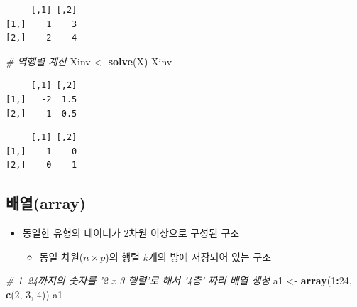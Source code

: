 \documentclass[11pt,a4paper]{book}
\newenvironment{Shaded}{\begin{snugshade}}{\end{snugshade}}
\newcommand{\KeywordTok}[1]{\textcolor[rgb]{0.13,0.29,0.53}{\textbf{#1}}}
\newcommand{\DecValTok}[1]{\textcolor[rgb]{0.00,0.00,0.81}{#1}}
\newcommand{\StringTok}[1]{\textcolor[rgb]{0.31,0.60,0.02}{#1}}
\newcommand{\CommentTok}[1]{\textcolor[rgb]{0.56,0.35,0.01}{\textit{#1}}}
\newcommand{\OperatorTok}[1]{\textcolor[rgb]{0.81,0.36,0.00}{\textbf{#1}}}
\newcommand{\NormalTok}[1]{#1}
\providecommand{\tightlist}{%
  \setlength{\itemsep}{0pt}\setlength{\parskip}{0pt}}
\theoremstyle{definition}
\theoremstyle{definition}
\theoremstyle{definition}
\theoremstyle{remark}
\begin{document}
\begin{verbatim}
     [,1] [,2]
[1,]    1    3
[2,]    2    4
\end{verbatim}

\begin{Shaded}
\begin{Highlighting}[]
\CommentTok{# 역행렬 계산}
\NormalTok{Xinv <-}\StringTok{ }\KeywordTok{solve}\NormalTok{(X)}
\NormalTok{Xinv}
\end{Highlighting}
\end{Shaded}

\begin{verbatim}
     [,1] [,2]
[1,]   -2  1.5
[2,]    1 -0.5
\end{verbatim}

\begin{Shaded}
\end{Shaded}

\begin{verbatim}
     [,1] [,2]
[1,]    1    0
[2,]    0    1
\end{verbatim}

\normalsize

\subsection{배열(array)}\label{array}

\begin{itemize}
\tightlist
\item
  동일한 유형의 데이터가 2차원 이상으로 구성된 구조

  \begin{itemize}
  \tightlist
  \item
    동일 차원(\(n\times p\))의 행렬 \(k\)개의 방에 저장되어 있는 구조
  \end{itemize}
\end{itemize}

\footnotesize

\begin{Shaded}
\begin{Highlighting}[]
\CommentTok{# 1~24까지의 숫자를 '2 x 3 행렬'로 해서 '4층' 짜리 배열 생성}
\NormalTok{a1 <-}\StringTok{ }\KeywordTok{array}\NormalTok{(}\DecValTok{1}\OperatorTok{:}\DecValTok{24}\NormalTok{, }\KeywordTok{c}\NormalTok{(}\DecValTok{2}\NormalTok{, }\DecValTok{3}\NormalTok{, }\DecValTok{4}\NormalTok{))}
\NormalTok{a1}
\end{Highlighting}
\end{Shaded}
\end{document}
